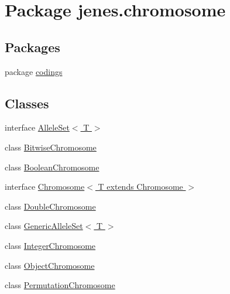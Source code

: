 \hypertarget{namespacejenes_1_1chromosome}{\section{Package jenes.\-chromosome}
\label{namespacejenes_1_1chromosome}
}
\subsection*{Packages}
\begin{DoxyCompactItemize}
\item 
package \hyperlink{namespacejenes_1_1chromosome_1_1codings}{codings}
\end{DoxyCompactItemize}
\subsection*{Classes}
\begin{DoxyCompactItemize}
\item 
interface \hyperlink{interfacejenes_1_1chromosome_1_1_allele_set_3_01_t_01_4}{Allele\-Set$<$ T $>$}
\item 
class \hyperlink{classjenes_1_1chromosome_1_1_bitwise_chromosome}{Bitwise\-Chromosome}
\item 
class \hyperlink{classjenes_1_1chromosome_1_1_boolean_chromosome}{Boolean\-Chromosome}
\item 
interface \hyperlink{interfacejenes_1_1chromosome_1_1_chromosome_3_01_t_01extends_01_chromosome_01_4}{Chromosome$<$ T extends Chromosome $>$}
\item 
class \hyperlink{classjenes_1_1chromosome_1_1_double_chromosome}{Double\-Chromosome}
\item 
class \hyperlink{classjenes_1_1chromosome_1_1_generic_allele_set_3_01_t_01_4}{Generic\-Allele\-Set$<$ T $>$}
\item 
class \hyperlink{classjenes_1_1chromosome_1_1_integer_chromosome}{Integer\-Chromosome}
\item 
class \hyperlink{classjenes_1_1chromosome_1_1_object_chromosome}{Object\-Chromosome}
\item 
class \hyperlink{classjenes_1_1chromosome_1_1_permutation_chromosome}{Permutation\-Chromosome}
\end{DoxyCompactItemize}
